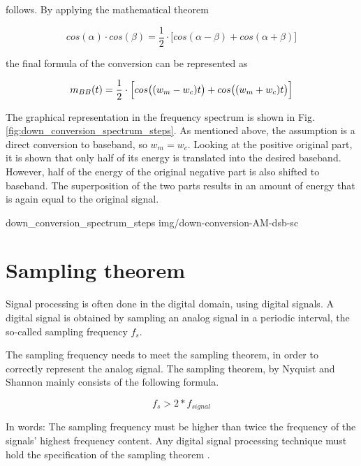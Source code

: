 follows.
By applying the mathematical theorem

\begin{equation}
  cos(\alpha) \cdot cos(\beta) = \frac{1}{2} \cdot \bigl[ cos(\alpha-\beta) + cos(\alpha+\beta) \bigr]
\end{equation}

the final formula of the conversion can be represented as

\begin{equation}
 m_{BB}(t) = \frac{1}{2} \cdot \Bigl[ cos\bigl((w_m-w_c)t\bigr) + cos\bigl((w_m+w_c)t\bigr) \Bigr]
\end{equation}

The graphical representation in the frequency spectrum is shown in Fig.\ref{fig:down_conversion_spectrum_steps}.
As mentioned above, the assumption is a direct conversion to baseband, so $w_m = w_c$.
Looking at the positive original part, it is shown that only half of its energy is translated into the desired baseband.
However, half of the energy of the original negative part is also shifted to baseband.
The superposition of the two parts results in an amount of energy that is again equal to the original signal.

 {down_conversion_spectrum_steps} {img/down-conversion-AM-dsb-sc}


\section{Sampling theorem}

Signal processing is often done in the digital domain, using digital signals.
A digital signal is obtained by sampling an analog signal in a periodic interval, the so-called sampling frequency $f_s$.

The sampling frequency needs to meet the sampling theorem, in order to correctly represent the analog signal.
The sampling theorem, by Nyquist and Shannon mainly consists of the following formula.

\begin{equation}
  f_{s} > 2*f_{signal}
\end{equation}

In words: The sampling frequency must be higher than twice the frequency of the signals' highest frequency content.
Any digital signal processing technique must hold the specification of the sampling theorem \cite[chpt. 4.2]{AlessioSilviaMaria2016DSPa}.


